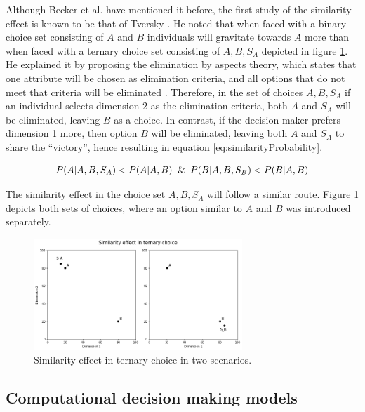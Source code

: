 \documentclass[a4paper,12pt]{article}
\newcommand{\citeyearonly}[1]{\citeyearpar{#1}}
\begin{document}
Although Becker et al. \citeyearonly{becker1964measuring} have mentioned it before, the first study of the similarity effect is known to be that of Tversky \citep{tversky1972elimination}. He noted that when faced with a binary choice set consisting of $A$ and $B$ individuals will gravitate towards $A$ more than when faced with a ternary choice set consisting of ${A, B, S_A}$ depicted in figure \ref{fig:similarityEffect}. He explained it by proposing the elimination by aspects theory, which states that one attribute will be chosen as elimination criteria, and all options that do not meet that criteria will be eliminated \citep{tversky1972elimination}. Therefore, in the set of choices ${A, B, S_A}$ if an individual selects dimension 2 as the elimination criteria, both $A$ and $S_A$ will be eliminated, leaving $B$ as a choice. In contrast, if the decision maker prefers dimension 1 more, then option
$B$ will be eliminated, leaving both $A$ and $S_A$ to share the ``victory'', hence resulting in equation \ref{eq:similarityProbability}.

\begin{equation}\label{eq:similarityProbability}
    P(A|A,B,S_A) < P(A|A,B) \And  P(B|A,B,S_B) < P(B|A,B)
\end{equation}

The similarity effect in the choice set ${A, B, S_A}$ will follow a similar route. Figure \ref{fig:similarityEffect} depicts both sets of choices, where an option similar to $A$ and $B$ was introduced separately.


\begin{figure}[h]
    \centering
    \includegraphics[width=0.7\textwidth]{staticFiles/SimilarityEffect.png}
    \caption{Similarity effect in ternary choice in two scenarios.} %
    \label{fig:similarityEffect} %

\end{figure}


\subsection{Computational decision making models}
\end{document}

